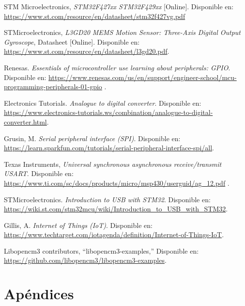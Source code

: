 \documentclass[12pt,a4paper]{article}
\begin{document}
\begin{thebibliography}{}
STM Microelectronics, \textit{STM32F427xx STM32F429xx} [Online]. Disponible en:
\url{https://www.st.com/resource/en/datasheet/stm32f427vg.pdf}

STMicroelectronics, \textit{L3GD20 MEMS Motion Sensor: Three-Axis Digital Output Gyroscope}, Datasheet [Online]. Disponible en: \url{https://www.st.com/resource/en/datasheet/l3gd20.pdf}.

Renesas. \textit{Essentials of microcontroller use learning about peripherals: GPIO}. Disponible en: \url{https://www.renesas.com/us/en/support/engineer-school/mcu-programming-peripherals-01-gpio} .

Electronics Tutorials. \textit{Analogue to digital converter}. Disponible en: \url{https://www.electronics-tutorials.ws/combination/analogue-to-digital-converter.html}.

Grusin, M. \textit{Serial peripheral interface (SPI)}. Disponible en: \url{https://learn.sparkfun.com/tutorials/serial-peripheral-interface-spi/all}.

Texas Instruments, \textit{Universal synchronous asynchronous receive/transmit USART}. Disponible en: \url{https://www.ti.com/sc/docs/products/micro/msp430/userguid/ag_12.pdf} .

STMicroelectronics. \textit{Introduction to USB with STM32}.  Disponible en: \url{https://wiki.st.com/stm32mcu/wiki/Introduction_to_USB_with_STM32}.


Gillis, A. \textit{Internet of Things (IoT)}. Disponible en: \url{https://www.techtarget.com/iotagenda/definition/Internet-of-Things-IoT}.

Libopencm3 contributors, ``libopencm3-examples,'' Disponible en: \url{https://github.com/libopencm3/libopencm3-examples}.






\end{thebibliography}





\section{Apéndices}



\end{document}
